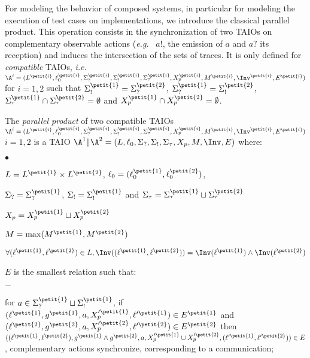 \documentclass{LMCS}
\theoremstyle{plain}\newtheorem{proposition}[thm]{Proposition}
\def\eg{{\em e.g.}}
\begin{document}
For modeling the behavior of composed systems, in particular for
modeling the execution of test cases on implementations, we introduce
the classical parallel product. This operation
consists in the synchronization of two TAIOs on complementary
  observable actions (\eg~ $a!$, the emission of $a$ and $a?$ its reception)
and induces the intersection of the sets of
traces. It is only defined for \emph{compatible} TAIOs,
  \emph{i.e.}
  $\A^i=(L^{\petit{i}},\ell_0^{\petit{i}},\Sigma_?^{\petit{i}},\Sigma_!^{\petit{i}},\Sigma_\tau^{\petit{i}},X_p^{\petit{i}},M^{\petit{i}},\Inv^{\petit{i}},E^{\petit{i}})$
  for $i=1,2$ such that $\Sigma_!^{\petit{1}}=\Sigma_?^{\petit{2}}$,
  $\Sigma_?^{\petit{1}}=\Sigma_!^{\petit{2}}$,
  $\Sigma_\tau^{\petit{1}}\cap \Sigma_\tau^{\petit{2}}=\emptyset$ and
  $X_p^{\petit{1}} \cap X_p^{\petit{2}}= \emptyset$. 
  \begin{defi}
\label{def:product}
 The \emph{parallel product} of two compatible TAIOs
   $\A^i=(L^{\petit{i}},\ell_0^{\petit{i}},\Sigma_?^{\petit{i}},\Sigma_!^{\petit{i}},\Sigma_\tau^{\petit{i}},X_p^{\petit{i}},M^{\petit{i}},\Inv^{\petit{i}},E^{\petit{i}})$
   $i=1,2$ 
is a TAIO $\A^1 \| \A^2 =
  (L,\ell_0,\Sigma_?,\Sigma_!,\Sigma_\tau,X_p,M,\Inv,E)$ where:
\begin{iteMize}{$\bullet$}
\item $L=L^{\petit{1}} \times L^{\petit{2}}$, $\ell_0 = (\ell_0^{\petit{1}},\ell_0^{\petit{2}})$,
\item $\Sigma_?= \Sigma_?^{\petit{1}}$, 
$\Sigma_!= \Sigma_!^{\petit{1}} $ and 
$\Sigma_\tau= \Sigma_\tau^{\petit{1}} \sqcup \Sigma_\tau^{\petit{2}}$
\item $X_p = X_p^{\petit{1}} \sqcup X_p^{\petit{2}}$
\item $M= \max(M^{\petit{1}}, M^{\petit{2}})$
\item $\forall (\ell^{\petit{1}},\ell^{\petit{2}}) \in L, 
  \Inv((\ell^{\petit{1}},\ell^{\petit{2}})) = \Inv(\ell^{\petit{1}}) \wedge \Inv(\ell^{\petit{2}})$ 
\item $E$ is the smallest relation such that:
\begin{iteMize}{$-$}
\item for $a \in \Sigma_?^{\petit{1}}\sqcup \Sigma_!^{\petit{1}}$,  
if $(\ell^{\petit{1}},g^{\petit{1}},a,X'^{\petit{1}}_p,\ell'^{\petit{1}}) \in E^{\petit{1}}$ and 
$(\ell^{\petit{2}},g^{\petit{2}},a,X'^{\petit{2}}_p,\ell'^{\petit{2}}) \in E^{\petit{2}}$ then
$((\ell^{\petit{1}},\ell^{\petit{2}}),g^{\petit{1}} \wedge g^{\petit{2}},a,
X'^{\petit{1}}_p \cup X'^{\petit{2}}_p,(\ell'^{\petit{1}},\ell'^{\petit{2}})) \in E$, \ie complementary actions synchronize, corresponding to a communication; 

\end{iteMize}
\end{iteMize}
\end{defi}
\end{document}

